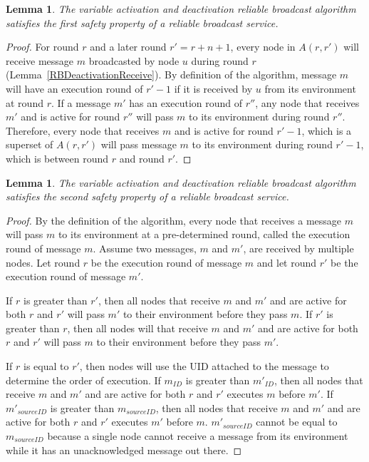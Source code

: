 \documentclass[english]{article}
\newtheorem{lemma}[theorem]{Lemma}
\begin{document}
\begin{lemma}
\label{DeactivationRBSafety1}
The variable activation and deactivation reliable broadcast algorithm satisfies the first safety property of a reliable broadcast service.
\end{lemma}
\begin{proof}

For round $r$ and a later round $r' = r + n + 1$, every node in $A(r,r')$ will receive message $m$ broadcasted by node $u$ during round $r$ (Lemma~\ref{RBDeactivationReceive}). By definition of the algorithm, message $m$ will have an execution round of $r'-1$ if it is received by $u$ from its environment at round $r$. If a message $m'$ has an execution round of $r''$, any node that receives $m'$ and is active for round $r''$ will pass $m$ to its environment during round $r''$. Therefore, every node that receives $m$ and is active for round $r'-1$, which is a superset of $A(r,r')$ will pass message $m$ to its environment during round $r'-1$, which is between round $r$ and round $r'$.

\end{proof}


\begin{lemma}
\label{DeactivationRBSafety2}
The variable activation and deactivation reliable broadcast algorithm satisfies the second safety property of a reliable broadcast service.
\end{lemma}
\begin{proof}

By the definition of the algorithm, every node that receives a message $m$ will pass $m$ to its environment at a pre-determined round, called the execution round of message $m$. Assume two messages, $m$ and $m'$, are received by multiple nodes. Let round $r$ be the execution round of message $m$ and let round $r'$ be the execution round of message $m'$.

If $r$ is greater than $r'$, then all nodes that receive $m$ and $m'$ and are active for both $r$ and $r'$ will pass $m'$ to their environment before they pass $m$. If $r'$ is greater than $r$, then all nodes will that receive $m$ and $m'$ and are active for both $r$ and $r'$ will pass $m$ to their environment before they pass $m'$.

If $r$ is equal to $r'$, then nodes will use the UID attached to the message to determine the order of execution. If $m_{ID}$ is greater than $m'_{ID}$, then all nodes that receive $m$ and $m'$ and are active for both $r$ and $r'$ executes $m$ before $m'$. If $m'_{sourceID}$ is greater than $m_{sourceID}$, then all nodes that receive $m$ and $m'$ and are active for both $r$ and $r'$ executes $m'$ before $m$. $m'_{sourceID}$ cannot be equal to $m_{sourceID}$ because a single node cannot receive a message from its environment while it has an unacknowledged message out there.



\end{proof}
\end{document}
